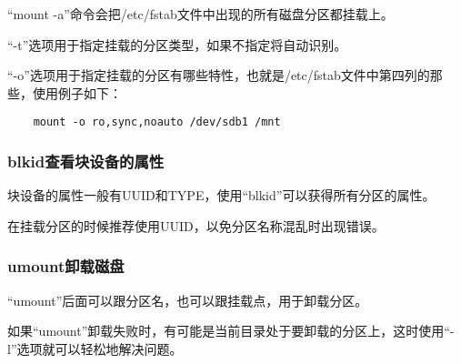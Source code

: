 \documentclass[a4paper,left=2.5cm,right=2.5cm,11pt]{article}
\begin{document}
	“mount -a”命令会把/etc/fstab文件中出现的所有磁盘分区都挂载上。\par

	“-t”选项用于指定挂载的分区类型，如果不指定将自动识别。\par

	“-o”选项用于指定挂载的分区有哪些特性，也就是/etc/fstab文件中第四列的那些，使用例子如下：
	\begin{lstlisting}
	mount -o ro,sync,noauto /dev/sdb1 /mnt
	\end{lstlisting}

\subsubsection{blkid查看块设备的属性}
	块设备的属性一般有UUID和TYPE，使用“blkid”可以获得所有分区的属性。\par

	在挂载分区的时候推荐使用UUID，以免分区名称混乱时出现错误。\par

\subsubsection{umount卸载磁盘}
	“umount”后面可以跟分区名，也可以跟挂载点，用于卸载分区。\par

	如果“umount”卸载失败时，有可能是当前目录处于要卸载的分区上，这时使用“-l”选项就可以轻松地解决问题。
	
\end{document}
